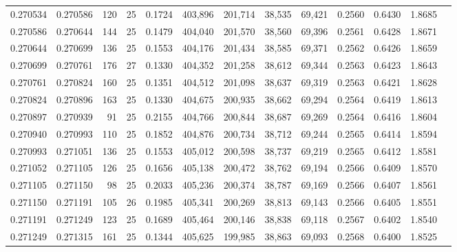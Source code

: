 \begin{tabular}{rrrrrrrrrrrrr}
0.270534 & 0.270586 &   120 &  25 &                                     0.1724 & 403,896 & 201,714 &  38,535 &  69,421 & 0.2560 & 0.6430 & 1.8685 \\
0.270586 & 0.270644 &   144 &  25 &                                     0.1479 & 404,040 & 201,570 &  38,560 &  69,396 & 0.2561 & 0.6428 & 1.8671 \\
0.270644 & 0.270699 &   136 &  25 &                                     0.1553 & 404,176 & 201,434 &  38,585 &  69,371 & 0.2562 & 0.6426 & 1.8659 \\
0.270699 & 0.270761 &   176 &  27 &                                     0.1330 & 404,352 & 201,258 &  38,612 &  69,344 & 0.2563 & 0.6423 & 1.8643 \\
0.270761 & 0.270824 &   160 &  25 &                                     0.1351 & 404,512 & 201,098 &  38,637 &  69,319 & 0.2563 & 0.6421 & 1.8628 \\
0.270824 & 0.270896 &   163 &  25 &                                     0.1330 & 404,675 & 200,935 &  38,662 &  69,294 & 0.2564 & 0.6419 & 1.8613 \\
0.270897 & 0.270939 &    91 &  25 &                                     0.2155 & 404,766 & 200,844 &  38,687 &  69,269 & 0.2564 & 0.6416 & 1.8604 \\
0.270940 & 0.270993 &   110 &  25 &                                     0.1852 & 404,876 & 200,734 &  38,712 &  69,244 & 0.2565 & 0.6414 & 1.8594 \\
0.270993 & 0.271051 &   136 &  25 &                                     0.1553 & 405,012 & 200,598 &  38,737 &  69,219 & 0.2565 & 0.6412 & 1.8581 \\
0.271052 & 0.271105 &   126 &  25 &                                     0.1656 & 405,138 & 200,472 &  38,762 &  69,194 & 0.2566 & 0.6409 & 1.8570 \\
0.271105 & 0.271150 &    98 &  25 &                                     0.2033 & 405,236 & 200,374 &  38,787 &  69,169 & 0.2566 & 0.6407 & 1.8561 \\
0.271150 & 0.271191 &   105 &  26 &                                     0.1985 & 405,341 & 200,269 &  38,813 &  69,143 & 0.2566 & 0.6405 & 1.8551 \\
0.271191 & 0.271249 &   123 &  25 &                                     0.1689 & 405,464 & 200,146 &  38,838 &  69,118 & 0.2567 & 0.6402 & 1.8540 \\
0.271249 & 0.271315 &   161 &  25 &                                     0.1344 & 405,625 & 199,985 &  38,863 &  69,093 & 0.2568 & 0.6400 & 1.8525 \\

\end{tabular}
